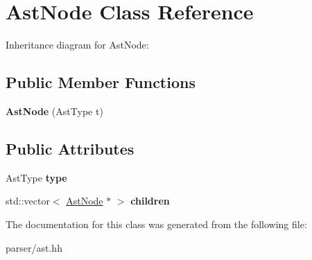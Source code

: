\hypertarget{classAstNode}{}\section{Ast\+Node Class Reference}
\label{classAstNode}


Inheritance diagram for Ast\+Node\+:
\subsection*{Public Member Functions}
\begin{DoxyCompactItemize}
\item 
\mbox{\label{classAstNode_a8769684b084e553a37d3faf7037098f2}} 
{\bfseries Ast\+Node} (Ast\+Type t)
\end{DoxyCompactItemize}
\subsection*{Public Attributes}
\begin{DoxyCompactItemize}
\item 
\mbox{\label{classAstNode_a4441eddf1918a818dd213404c58f1cb4}} 
Ast\+Type {\bfseries type}
\item 
\mbox{\label{classAstNode_a1eb495eecc276eb4da2127da9e50d97f}} 
std\+::vector$<$ \hyperlink{classAstNode}{Ast\+Node} $\ast$ $>$ {\bfseries children}
\end{DoxyCompactItemize}


The documentation for this class was generated from the following file\+:\begin{DoxyCompactItemize}
\item 
parser/ast.\+hh\end{DoxyCompactItemize}
